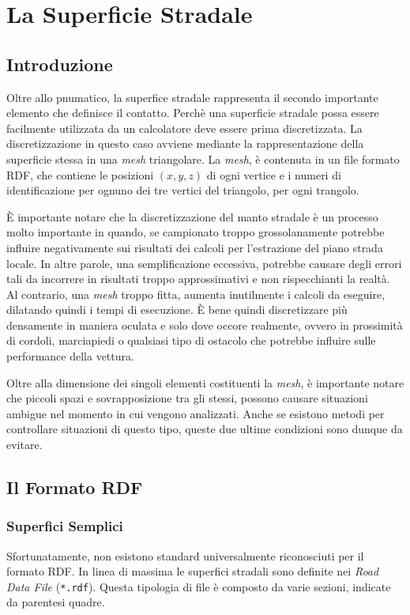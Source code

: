\chapter{La Superficie Stradale}
\label{rdf}
%
\section{Introduzione}
Oltre allo pnumatico, la superfice stradale rappresenta il secondo importante elemento che definisce il contatto. Perchè una superficie stradale possa essere facilmente utilizzata da un calcolatore deve essere prima discretizzata. La discretizzazione in questo caso avviene mediante la rappresentazione della superficie stessa in una \textit{mesh} triangolare. La \textit{mesh}, è contenuta in un file formato \ac{RDF}, che contiene le posizioni $(x,y,z)$ di ogni vertice e i numeri di identificazione per ognuno dei tre vertici del triangolo, per ogni trangolo.

È importante notare che la discretizzazione del manto stradale è un processo molto importante in quando, se campionato troppo grossolanamente potrebbe influire negativamente sui risultati dei calcoli per l'estrazione del piano strada locale. In altre parole, una semplificazione eccessiva, potrebbe causare degli errori tali da incorrere in risultati troppo approssimativi e non rispecchianti la realtà. Al contrario, una \textit{mesh} troppo fitta, aumenta inutilmente i calcoli da eseguire, dilatando quindi i tempi di esecuzione. È bene quindi discretizzare più densamente in maniera oculata e solo dove occore realmente, ovvero in prossimità di cordoli, marciapiedi o qualsiasi tipo di ostacolo che potrebbe influire sulle performance della vettura.

Oltre alla dimensione dei singoli elementi costituenti la \textit{mesh}, è importante notare che piccoli spazi e sovrapposizione tra gli stessi, possono causare situazioni ambigue nel momento in cui vengono analizzati. Anche se esistono metodi per controllare situazioni di questo tipo, queste due ultime condizioni sono dunque da evitare.
%
\section{Il Formato RDF}
%
\subsection{Superfici Semplici}
Sfortunatamente, non esistono standard universalmente riconosciuti per il formato RDF. In linea di massima le superfici stradali sono definite nei \textit{Road Data File} (\texttt{*.rdf}). Questa tipologia di file è composto da varie sezioni, indicate da parentesi quadre.


